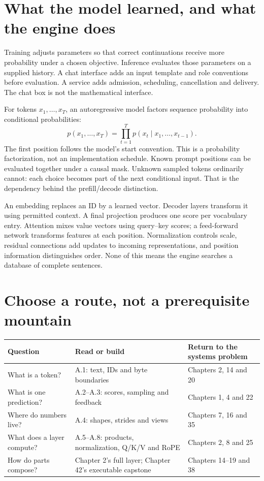 \section*{What the model learned, and what the engine does}
Training adjusts parameters so that correct continuations receive more
probability under a chosen objective. Inference evaluates those parameters
on a supplied history. A chat interface adds an input template and role
conventions before evaluation. A service adds admission, scheduling,
cancellation and delivery. The chat box is not the mathematical interface.

For tokens $x_1,\ldots,x_T$, an autoregressive model factors sequence
probability into conditional probabilities:
\[
 p(x_1,\ldots,x_T)=\prod_{t=1}^{T}p(x_t\mid x_1,\ldots,x_{t-1}).
\]
The first position follows the model's start convention. This is a
probability factorization, not an implementation schedule. Known prompt
positions can be evaluated together under a causal mask. Unknown sampled
tokens ordinarily cannot: each choice becomes part of the next conditional
input. That is the dependency behind the prefill/decode distinction.

An embedding replaces an ID by a learned vector. Decoder layers transform
it using permitted context. A final projection produces one score per
vocabulary entry. Attention mixes value vectors using query--key scores;
a feed-forward network transforms features at each position. Normalization
controls scale, residual connections add updates to incoming representations,
and position information distinguishes order. None of this means the engine
searches a database of complete sentences.

\section*{Choose a route, not a prerequisite mountain}
\begin{longtable}{@{}p{.20\linewidth}p{.34\linewidth}p{.38\linewidth}@{}}
\toprule Question & Read or build & Return to the systems problem\\\midrule
What is a token? & A.1: text, IDs and byte boundaries & Chapters 2, 14 and 20\\
What is one prediction? & A.2--A.3: scores, sampling and feedback & Chapters 1, 4 and 22\\
Where do numbers live? & A.4: shapes, strides and views & Chapters 7, 16 and 35\\
What does a layer compute? & A.5--A.8: products, normalization, Q/K/V and RoPE & Chapters 2, 8 and 25\\
How do parts compose? & Chapter 2's full layer; Chapter 42's executable capstone & Chapters 14--19 and 38\\
\bottomrule
\end{longtable}

